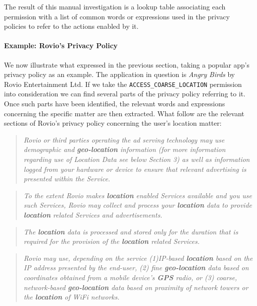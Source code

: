 \documentclass[twoside,letterpaper]{soups}
\theoremstyle{definition}
\begin{document}
The result of this manual investigation is a lookup table associating each permission with a list of common words or expressions used in the privacy policies to refer to the actions enabled by it.

\paragraph{Example: Rovio's Privacy Policy}
We now illustrate what expressed in the previous section, taking a popular app's privacy policy as an example. The application in question is \emph{Angry Birds} by Rovio Entertainment Ltd. If we take the \texttt{ACCESS\_COARSE\_LOCATION} permission into consideration we can find several parts of the privacy policy referring to it. Once such parts have been identified, the relevant words and expressions concerning the specific matter are then extracted. What follow are the relevant sections of Rovio's privacy policy concerning the user's location matter:

\begin{quote}
\emph{Rovio or third parties operating the ad serving technology may use demographic and \textbf{geo-location} information (for more information regarding use of Location Data see below Section 3) as well as information logged from your hardware or device to ensure that relevant advertising is presented within the Service.}
\end{quote}

\begin{quote}
\emph{To the extent Rovio makes \textbf{location} enabled Services available and you use such Services, Rovio may collect and process your \textbf{\textbf{location}} data to provide \textbf{location} related Services and advertisements.}
\end{quote}

\begin{quote}
\emph{The \textbf{location} data is processed and stored only for the duration that is required for the provision of the \textbf{location} related Services.}
\end{quote}

\begin{quote}
\emph{Rovio may use, depending on the service (1)IP-based \textbf{location} based on the IP address presented by the end-user, (2) fine \textbf{geo-location} data based on coordinates obtained from a mobile device's \textbf{GPS} radio, or (3) coarse, network-based \textbf{geo-location} data based on proximity of network towers or the \textbf{location} of WiFi networks.}
\end{quote}
\end{document}
